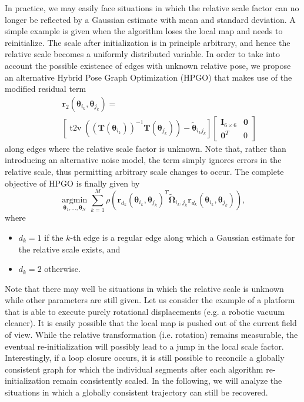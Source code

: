 \documentclass[letterpaper, 10 pt, conference]{ieeeconf}  %
\begin{document}
In practice, we may easily face situations in which the relative scale factor can no longer be reflected by a Gaussian estimate with mean and standard deviation. A simple example is given when the algorithm loses the local map and needs to reinitialize. The scale after initialization is in principle arbitrary, and hence the relative scale becomes a uniformly distributed variable. In order to take into account the possible existence of edges with unknown relative pose, we propose an alternative Hybrid Pose Graph Optimization (HPGO) that makes use of the modified residual term
%
\begin{eqnarray}
& & \mathbf{r}_2(\boldsymbol{\theta}_{i_k},\boldsymbol{\theta}_{j_k})= \\ 
& & \left[ \operatorname{t2v}
  \left(\left(\mathbf{T}\left(\boldsymbol{\theta}_{i_k}\right)\right)^{-1} \mathbf{T}\left(\boldsymbol{\theta}_{j_k}\right)\right) - \tilde{\boldsymbol{\theta}}_{i_kj_k}\right] \left[ \begin{matrix} \mathbf{I}_{6\times 6} & \mathbf{0} \\ \mathbf{0}^T & 0 \end{matrix} \right] \nonumber
\end{eqnarray}
%
along edges where the relative scale factor is unknown. Note that, rather than introducing an alternative noise model, the term simply ignores errors in the relative scale, thus permitting arbitrary scale changes to occur. The complete objective of HPGO is finally given by
%
\begin{equation}
  \underset{\boldsymbol{\theta}_1, \ldots, \boldsymbol{\theta}_N}{\operatorname{argmin}} \sum_{k=1}^{M} \rho\left( \mathbf{r}_{d_k}(\boldsymbol{\theta}_{i_k},\boldsymbol{\theta}_{j_k})^T \boldsymbol{\tilde{\Omega}}_{i_k,j_k} \mathbf{r}_{d_k}(\boldsymbol{\theta}_{i_k},\boldsymbol{\theta}_{j_k}) \right),
\end{equation}
%
where
%
\begin{itemize}
  \item $d_k = 1$ if the $k$-th edge is a regular edge along which a Gaussian estimate for the relative scale exists, and
  \item $d_k = 2$ otherwise.
\end{itemize}

Note that there may well be situations in which the relative scale is unknown while other parameters are still given. Let us consider the example of a platform that is able to execute purely rotational displacements (e.g. a robotic vacuum cleaner). It is easily possible that the local map is pushed out of the current field of view. While the relative transformation (i.e. rotation) remains measurable, the eventual re-initialization will possibly lead to a jump in the local scale factor. Interestingly, if a loop closure occurs, it is still possible to reconcile a globally consistent graph for which the individual segments after each algorithm re-initialization remain consistently scaled. In the following, we will analyze the situations in which a globally consistent trajectory can still be recovered.
\end{document}
